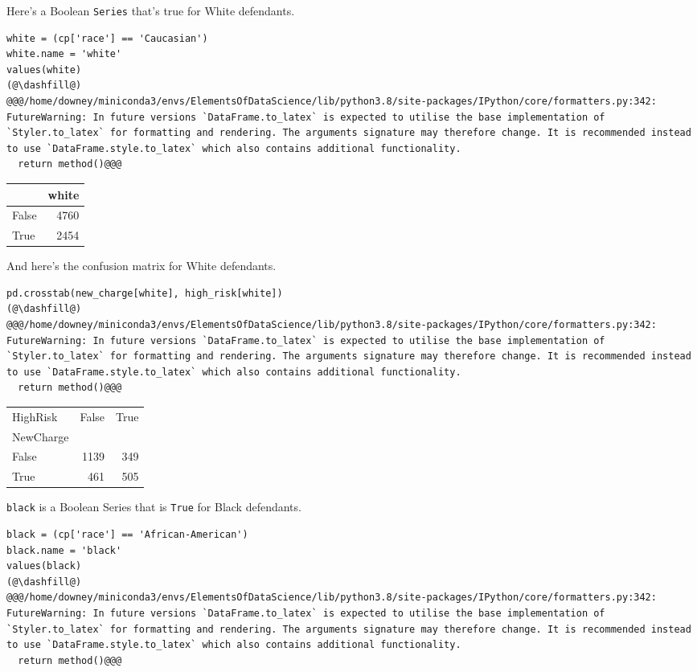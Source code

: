 Here's a Boolean \passthrough{\lstinline!Series!} that's true for White
defendants.

\begin{lstlisting}[]
white = (cp['race'] == 'Caucasian')
white.name = 'white'
values(white)
(@\dashfill@)
@@@/home/downey/miniconda3/envs/ElementsOfDataScience/lib/python3.8/site-packages/IPython/core/formatters.py:342: FutureWarning: In future versions `DataFrame.to_latex` is expected to utilise the base implementation of `Styler.to_latex` for formatting and rendering. The arguments signature may therefore change. It is recommended instead to use `DataFrame.style.to_latex` which also contains additional functionality.
  return method()@@@
\end{lstlisting}

\begin{tabular}{lr}
\midrule
{} &  white \\
\midrule
False &   4760 \\
True  &   2454 \\
\midrule
\end{tabular}

And here's the confusion matrix for White defendants.

\begin{lstlisting}[]
pd.crosstab(new_charge[white], high_risk[white])
(@\dashfill@)
@@@/home/downey/miniconda3/envs/ElementsOfDataScience/lib/python3.8/site-packages/IPython/core/formatters.py:342: FutureWarning: In future versions `DataFrame.to_latex` is expected to utilise the base implementation of `Styler.to_latex` for formatting and rendering. The arguments signature may therefore change. It is recommended instead to use `DataFrame.style.to_latex` which also contains additional functionality.
  return method()@@@
\end{lstlisting}

\begin{tabular}{lrr}
\midrule
HighRisk &  False &  True  \\
NewCharge &        &        \\
\midrule
False     &   1139 &    349 \\
True      &    461 &    505 \\
\midrule
\end{tabular}

\passthrough{\lstinline!black!} is a Boolean Series that is
\passthrough{\lstinline!True!} for Black defendants.

\begin{lstlisting}[]
black = (cp['race'] == 'African-American')
black.name = 'black'
values(black)
(@\dashfill@)
@@@/home/downey/miniconda3/envs/ElementsOfDataScience/lib/python3.8/site-packages/IPython/core/formatters.py:342: FutureWarning: In future versions `DataFrame.to_latex` is expected to utilise the base implementation of `Styler.to_latex` for formatting and rendering. The arguments signature may therefore change. It is recommended instead to use `DataFrame.style.to_latex` which also contains additional functionality.
  return method()@@@
\end{lstlisting}


